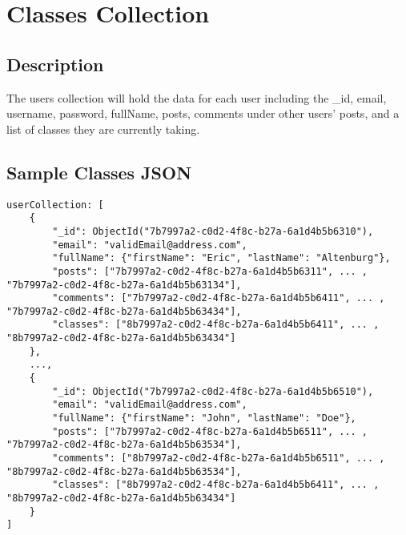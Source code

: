 \documentclass[preprint,11pt,3p]{article}
\begin{document}
\newpage

\section{Classes Collection}

\subsection{Description}
	The users collection will hold the data for each user including the _id, email, username, password, fullName, posts, comments under other users' posts, and a list of classes they are currently taking.

\subsection{Sample Classes JSON}
\begin{lstlisting}
userCollection: [
	{
		"_id": ObjectId("7b7997a2-c0d2-4f8c-b27a-6a1d4b5b6310"),
		"email": "validEmail@address.com",
		"fullName": {"firstName": "Eric", "lastName": "Altenburg"},
		"posts": ["7b7997a2-c0d2-4f8c-b27a-6a1d4b5b6311", ... , "7b7997a2-c0d2-4f8c-b27a-6a1d4b5b63134"],
		"comments": ["7b7997a2-c0d2-4f8c-b27a-6a1d4b5b6411", ... , "7b7997a2-c0d2-4f8c-b27a-6a1d4b5b63434"],
		"classes": ["8b7997a2-c0d2-4f8c-b27a-6a1d4b5b6411", ... , "8b7997a2-c0d2-4f8c-b27a-6a1d4b5b63434"]
	},
	...,
	{
		"_id": ObjectId("7b7997a2-c0d2-4f8c-b27a-6a1d4b5b6510"),
		"email": "validEmail@address.com",
		"fullName": {"firstName": "John", "lastName": "Doe"},
		"posts": ["7b7997a2-c0d2-4f8c-b27a-6a1d4b5b6511", ... , "7b7997a2-c0d2-4f8c-b27a-6a1d4b5b63534"],
		"comments": ["8b7997a2-c0d2-4f8c-b27a-6a1d4b5b6511", ... , "8b7997a2-c0d2-4f8c-b27a-6a1d4b5b63534"],
		"classes": ["8b7997a2-c0d2-4f8c-b27a-6a1d4b5b6411", ... , "8b7997a2-c0d2-4f8c-b27a-6a1d4b5b63434"]
	}
]
\end{lstlisting}


\newpage
\end{document}
